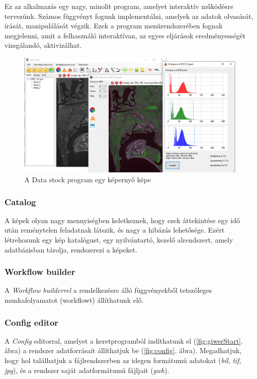 \documentclass[a4paper,12pt]{article}
\begin{document}
Ez az alkalmazás egy nagy, minolit program, amelyet interaktív működésre tervezünk. Számos függvényt fogunk implementálni, amelyek az adatok olvasását, írását, manipulálását végzik. Ezek a program menürendszerében fognak megjelenni, amit a felhasználó interaktívan, az egyes eljárások eredményességét vizsgálandó, aktivizálhat.

\begin{figure}[h]
	\centering
	\includegraphics[width=14cm]{datastock1.png}
	\caption{A Data stock program egy képernyő képe}
	\label{fig:datastockStart}
\end{figure}

\subsubsection{Catalog}

A képek olyan nagy mennyiségben keletkeznek, hogy ezek áttekintése egy idő után reménytelen feladatnak látszik, és nagy a hibázás lehetősége. Ezért létrehozunk egy kép katalógust, egy nyilvántartó, kezelő alrendszert, amely adatbázisban tárolja, rendszerezi a képeket.

\subsubsection{Workflow builder}

A\textit{ Workflow builderrel} a rendelkezésre álló függvényekből tetszőleges munkafolyamatot (workflowt) állíthatunk elő.

\subsubsection{Config editor}

A \textit{Config} editorral, amelyet a keretprogramból indíthatunk el (\ref{fig:giwerStart}. ábra) a rendszer adatforrásait állíthatjuk be (\ref{fig:config}. ábra). Megadhatjuk, hogy hol találhatjuk a fájlrendszerben az idegen formátumú adatokat (\textit{bil}, \textit{tif}, \textit{jpg}), és a rendszer saját adatformátumú fájljait (\textit{gwh}).
\end{document}
